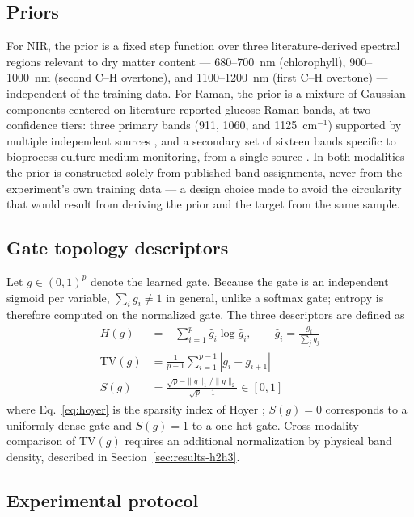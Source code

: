 \documentclass[preprint,12pt]{elsarticle}
\begin{document}
\subsection{Priors}
\label{sec:priors}

For NIR, the prior is a fixed step function over three literature-derived spectral regions relevant to dry matter content --- 680--700~nm (chlorophyll), 900--1000~nm (second C--H overtone), and 1100--1200~nm (first C--H overtone) \cite{saranwong2004} --- independent of the training data. For Raman, the prior is a mixture of Gaussian components centered on literature-reported glucose Raman bands, at two confidence tiers: three primary bands (911, 1060, and 1125~cm$^{-1}$) supported by multiple independent sources \cite{lyu2012,kang2020}, and a secondary set of sixteen bands specific to bioprocess culture-medium monitoring, from a single source \cite{uspatent2024}. In both modalities the prior is constructed solely from published band assignments, never from the experiment's own training data --- a design choice made to avoid the circularity that would result from deriving the prior and the target from the same sample.

\subsection{Gate topology descriptors}
\label{sec:topology}

Let $g\in(0,1)^{p}$ denote the learned gate. Because the gate is an independent sigmoid per variable, $\sum_i g_i \neq 1$ in general, unlike a softmax gate; entropy is therefore computed on the normalized gate. The three descriptors are defined as
\begin{align}
H(g) &= -\sum_{i=1}^{p} \hat g_i \log \hat g_i, \qquad \hat g_i = \frac{g_i}{\sum_j g_j} \label{eq:entropy}\\
\mathrm{TV}(g) &= \frac{1}{p-1}\sum_{i=1}^{p-1} |g_i - g_{i+1}| \label{eq:tv}\\
S(g) &= \frac{\sqrt{p}-\|g\|_1/\|g\|_2}{\sqrt{p}-1} \in [0,1] \label{eq:hoyer}
\end{align}
where Eq.~\eqref{eq:hoyer} is the sparsity index of Hoyer \cite{hoyer2004}; $S(g)=0$ corresponds to a uniformly dense gate and $S(g)=1$ to a one-hot gate. Cross-modality comparison of $\mathrm{TV}(g)$ requires an additional normalization by physical band density, described in Section~\ref{sec:results-h2h3}.

\subsection{Experimental protocol}
\end{document}
